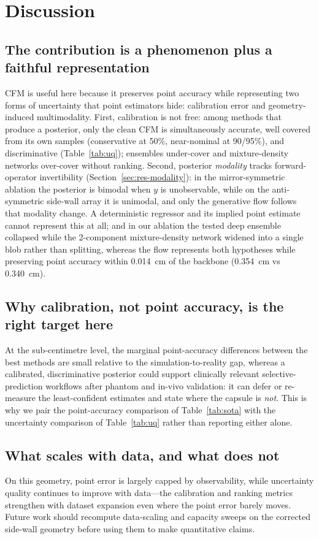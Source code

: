 \section{Discussion}\label{sec:discussion}

\subsection{The contribution is a phenomenon plus a faithful representation}
CFM is useful here because it preserves point accuracy while representing two
forms of uncertainty that point estimators hide: calibration error and
geometry-induced multimodality. First, calibration is not free: among methods
that produce a posterior, only the clean CFM is simultaneously accurate, well
covered from its own samples (conservative at 50\%, near-nominal at 90/95\%),
and discriminative (Table~\ref{tab:uq}); ensembles under-cover and
mixture-density networks over-cover without ranking. Second,
posterior \emph{modality} tracks forward-operator invertibility
(Section~\ref{sec:res-modality}): in the mirror-symmetric ablation the posterior
is bimodal when $y$ is unobservable, while on the anti-symmetric side-wall array it is unimodal, and only
the generative flow follows that modality change. A deterministic regressor and
its implied point estimate cannot represent this at all; and in our ablation the
tested deep ensemble collapsed while the 2-component mixture-density network
widened into a single blob rather than splitting, whereas the flow represents
both hypotheses while preserving point accuracy within \SI{0.014}{cm} of the
backbone (\SI{0.354}{cm} vs \SI{0.340}{cm}).

\subsection{Why calibration, not point accuracy, is the right target here}
At the sub-centimetre level, the marginal point-accuracy differences between the
best methods are small relative to the simulation-to-reality gap, whereas a
calibrated, discriminative posterior could support clinically relevant
selective-prediction workflows after phantom and in-vivo validation: it can
defer or re-measure the least-confident estimates and state where the capsule is
\emph{not}. This is why we pair the point-accuracy comparison of
Table~\ref{tab:sota} with the uncertainty comparison of Table~\ref{tab:uq}
rather than reporting either alone.

\subsection{What scales with data, and what does not}
On this geometry, point error is largely capped by observability, while
uncertainty quality continues to improve with data---the calibration and
ranking metrics strengthen with dataset expansion even where the point error
barely moves. Future work should recompute data-scaling and capacity sweeps on
the corrected side-wall geometry before using them to make quantitative claims.


